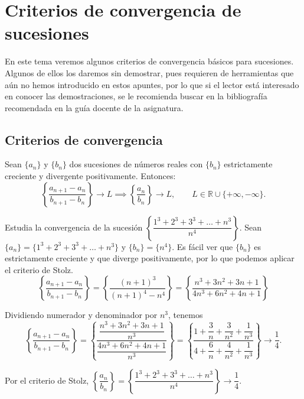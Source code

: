 \chapter{Criterios de convergencia de sucesiones}\label{chp:Tema8}

En este tema veremos algunos criterios de convergencia básicos para sucesiones. Algunos de ellos los daremos sin demostrar, pues requieren de herramientas que aún no hemos introducido en estos apuntes, por lo que si el lector está interesado en conocer las demostraciones, se le recomienda buscar en la bibliografía recomendada en la guía docente de la asignatura.


\section{Criterios de convergencia}
\begin{teo}
    Sean $\{a_n\}$ y $\{b_n\}$ dos sucesiones de números reales con $\{b_n\}$ estrictamente creciente y divergente positivamente.
    Entonces:
    \begin{equation*}
        \left\{\dfrac{a_{n+1} - a_n}{b_{n+1} - b_n}\right\} \longrightarrow L \implies \left\{\dfrac{a_n}{b_n}\right\} \longrightarrow L, \qquad L \in \mathbb{R} \cup \{+ \infty, -\infty\}.
    \end{equation*}
\end{teo}

\begin{ejemplo}
    Estudia la convergencia de la sucesión $\left\{\dfrac{1^3 + 2^3 + 3^3 + \dots + n^3}{n^4}\right\}$.
    \newline
    \newline
    Sean $\{a_n\} = \{1^3 + 2^3 + 3^3 + \dots + n^3\}$ y $\{b_n\} = \{n^4\}$. Es fácil ver que $\{b_n\}$ es estrictamente
    creciente y que diverge positivamente, por lo que podemos aplicar el criterio de Stolz.
    \begin{equation*}
        \left\{\frac{a_{n+1} - a_n}{b_{n+1} - b_n}\right\} = \left\{\frac{(n+1)^3}{(n+1)^4- n^4}\right\} = \left\{\frac{n^3 + 3n^2 + 3n + 1}{4n^3 + 6n^2 + 4n + 1}\right\}
    \end{equation*}
    
    Dividiendo numerador y denominador por $n^3$, tenemos
    \begin{equation*}
        \left\{\dfrac{a_{n+1} - a_n}{b_{n+1} - b_n}\right\} = \left\{\dfrac{\dfrac{n^3 + 3n^2 + 3n + 1}{n^3}}{\dfrac{4n^3 + 6n^2 + 4n + 1}{n^3}}\right\} =
        \left\{ \dfrac{1 + \dfrac{3}{n} + \dfrac{3}{n^2} + \dfrac{1}{n^3}}{4 + \dfrac{6}{n} + \dfrac{4}{n^2} + \dfrac{1}{n^3}} \right\} \longrightarrow \dfrac{1}{4}.
    \end{equation*}
    
    Por el criterio de Stolz, $\left\{\dfrac{a_n}{b_n}\right\} = \left\{\dfrac{1^3 + 2^3 + 3^3 + \dots + n^3}{n^4}\right\} \longrightarrow \dfrac{1}{4}$.
\end{ejemplo}

